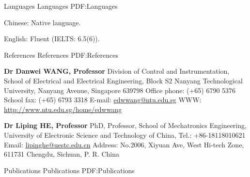 \documentclass[letterpaper,MMMyyyy,nonstopmode]{simpleresumecv}
\begin{document}
\begin{Body}

\Section
{Languages}
{Languages}
{PDF:Languages}

\BulletItem
Chinese: Native language.

\Gap
\BulletItem
English: Fluent (IELTS: 6.5(6)).



\Section
{References}
{References}
{PDF:References}

\BulletItem
\textbf{Dr Danwei WANG, Professor}
\newline
Division of Control and Instrumentation,
School of Electrical and Electrical Engineering, Block S2
\newline
Nanyang Technological University,
Nanyang Avenue, Singapore 639798
\newline
Office phone: (+65) 6790 5376
\newline
School fax: (+65) 6793 3318
\newline
E-mail: \url{edwwang@ntu.edu.sg}
\newline
WWW: \url{http://www.ntu.edu.sg/home/edwwang}

\BigGap
\BulletItem
\textbf{Dr Liping HE, Professor}
\newline
PhD, Professor, School of Mechatronics Engineering,
\newline
University of Electronic Science and Technology of China,
\newline
Tel.: +86-18118010621
\newline
Email: \url{lipinghe@uestc.edu.cn}
\newline
Address: No.2006, Xiyuan Ave, West Hi-tech Zone, 611731 Chengdu, Sichuan, P. R. China


\Section
{Publications}
{Publications}
{PDF:Publications}

\begingroup
\renewcommand{\MaxNumberedItem}{[88]}

\nocite{*}



\endgroup













\end{Body}


\UseNoteFont%
\null\hfill%
\end{document}
